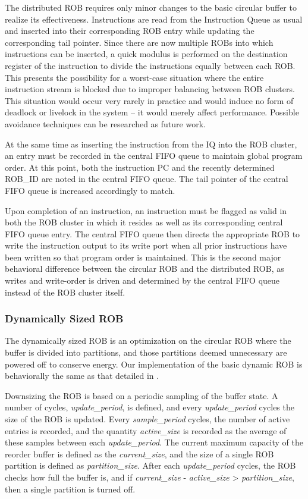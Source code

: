 \documentclass{acm_proc_article-sp}
\begin{document}
The distributed ROB requires only minor changes to the basic circular buffer to realize its effectiveness.  Instructions are 
read from the Instruction Queue as usual and inserted into their corresponding ROB entry while updating the corresponding tail 
pointer.  Since there are now multiple ROBs into which instructions can be inserted, a quick modulus is performed on the 
destination register of the instruction to divide the instructions equally between each ROB.  This presents the possibility 
for a worst-case situation where the entire instruction stream is blocked due to improper balancing between ROB clusters.  
This situation would occur very rarely in practice and would induce no form of deadlock or livelock in the system -- 
it would merely affect performance.  Possible avoidance techniques can be researched as future work.

At the same time as inserting the instruction from the IQ into the ROB cluster, an entry must be recorded in the central FIFO 
queue to maintain global program order.  At this point, both the instruction PC and the recently determined ROB_ID are 
noted in the central FIFO queue.  The tail pointer of the central FIFO queue is increased accordingly to match.

Upon completion of an instruction, an instruction must be flagged as valid in both the ROB cluster in which it resides as well 
as its corresponding central FIFO queue entry.  The central FIFO queue then directs the appropriate ROB to write the instruction 
output to its write port when all prior instructions have been written so that program order is maintained.  This is the second 
major behavioral difference between the circular ROB and the distributed ROB, as writes and write-order is driven and determined by 
the central FIFO queue instead of the ROB cluster itself. 

\subsubsection{Dynamically Sized ROB}
The dynamically sized ROB is an optimization on the circular ROB where the buffer is divided into partitions, and those partitions deemed unnecessary are powered off to conserve energy. Our implementation of the basic dynamic ROB is behaviorally the same as that detailed in \cite{kucuk2}.

Downsizing the ROB is based on a periodic sampling of the buffer state. A number of cycles, {\it update\_period}, is defined, and every {\it update\_period} cycles the size of the ROB is updated. Every {\it sample\_period} cycles, the number of active entries is recorded, and the quantity {\it active\_size} is recorded as the average of these samples between each {\it update\_period}. The current maximum capacity of the reorder buffer is defined as the {\it current\_size}, and the size of a single ROB partition is defined as {\it partition\_size}. After each {\it update\_period} cycles, the ROB checks how full the buffer is, and if {\it current\_size} - {\it active\_size} > {\it partition\_size}, then a single partition is turned off.
\end{document}
